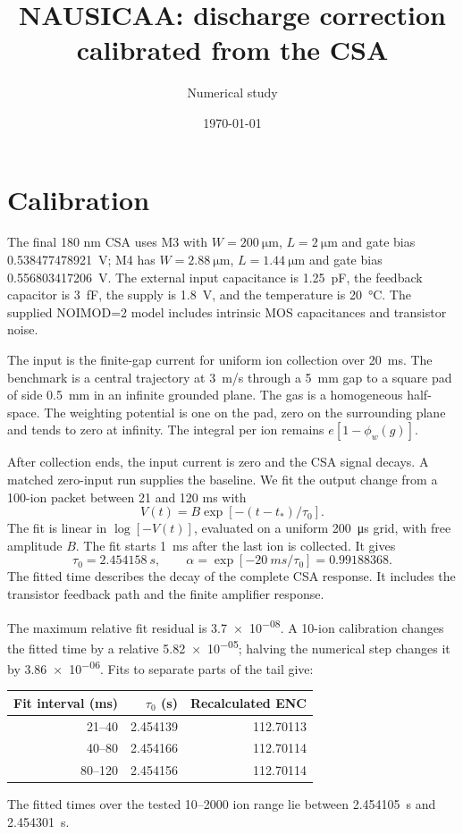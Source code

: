 \documentclass[11pt,a4paper]{article}
\title{NAUSICAA: discharge correction calibrated from the CSA}
\author{Numerical study}\date{\today}
\begin{document}
\maketitle
\section{Calibration}
The final 180 nm CSA uses M3 with $W=\SI{200}{\micro\metre}$,
$L=\SI{2}{\micro\metre}$ and gate bias \SI{0.538477478921}{V};
M4 has $W=\SI{2.88}{\micro\metre}$, $L=\SI{1.44}{\micro\metre}$
and gate bias \SI{0.556803417206}{V}. The external input capacitance is
\SI{1.25}{pF}, the feedback capacitor is \SI{3}{fF}, the supply is
\SI{1.8}{V}, and the temperature is \SI{20}{\celsius}. The supplied
NOIMOD=2 model includes intrinsic MOS capacitances and transistor noise.

The input is the finite-gap current for uniform ion collection over
\SI{20}{ms}. The benchmark is a central trajectory at \SI{3}{m/s} through
a \SI{5}{mm} gap to a square pad of side \SI{0.5}{mm} in an infinite grounded
plane. The gas is a homogeneous half-space. The weighting potential is one
on the pad, zero on the surrounding plane and tends to zero at infinity.
The integral per ion remains $e[1-\phi_w(g)]$.

After collection ends, the input current is zero and the CSA signal decays.
A matched zero-input run supplies the baseline. We fit the output change
from a 100-ion packet between 21 and 120 ms with
\[
 V(t)=B\exp[-(t-t_*)/\tau_0].
\]
The fit is linear in $\log[-V(t)]$, evaluated on a uniform \SI{200}{\micro\second}
grid, with free amplitude $B$. The fit starts \SI{1}{ms} after the last ion
is collected. It gives
\[
 \tau_0=\SI{2.454158}{s},\qquad
 \alpha=\exp[-\SI{20}{ms}/\tau_0]=0.99188368.
\]
The fitted time describes the decay of the complete CSA response. It includes
the transistor feedback path and the finite amplifier response.

The maximum relative fit residual is \num{3.7e-08}. A 10-ion calibration
changes the fitted time by a relative \num{5.82e-05}; halving the numerical
step changes it by \num{3.86e-06}. Fits to separate parts of the tail give:
\begin{center}\begin{tabular}{rrr}\toprule
Fit interval (ms) & $\tau_0$ (s) & Recalculated ENC\\\midrule
21--40 & 2.454139 & 112.70113 \\
40--80 & 2.454166 & 112.70114 \\
80--120 & 2.454156 & 112.70114 \\
\bottomrule\end{tabular}\end{center}
The fitted times over the tested 10--2000 ion range lie between
\SI{2.454105}{s} and \SI{2.454301}{s}.
\end{document}
